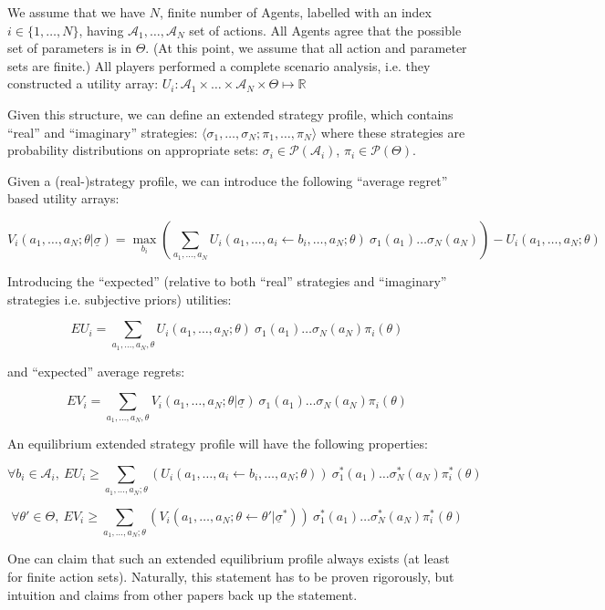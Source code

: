 \documentclass{article}
\begin{document}
We assume that we have $N$, finite number of Agents, labelled with an index $i \in \{1,\dots,N\}$, having $\mathcal{A}_1,\dots,\mathcal{A}_N$ set of actions.
All Agents agree that the possible set of parameters is in $\Theta$.
(At this point, we assume that all action and parameter sets are finite.)
All players performed a complete scenario analysis, i.e. they constructed a utility array:
$U_i : \mathcal{A}_1 \times \dots \times \mathcal{A}_N \times \Theta \mapsto \mathbb{R}$

Given this structure, we can define an extended strategy profile, which contains ``real'' and ``imaginary'' strategies: $\langle \sigma_1,\dots,\sigma_N; \pi_1,\dots,\pi_N \rangle$ where these strategies are probability distributions on appropriate sets:
$\sigma_i \in \mathscr{P}(\mathcal{A}_i)$, $\pi_i \in \mathscr{P}(\Theta)$.

Given a (real-)strategy profile, we can introduce the following ``average regret'' based utility arrays:

\[
V_i (a_1,\dots,a_N;\theta | \underline{\sigma}) = \max_{b_i} 
\left (
\sum_{a_1,\dots,a_N} U_i(a_1,\dots,a_i \leftarrow b_i,\dots,a_N;\theta) \ 
\sigma_1(a_1) \dots \sigma_N(a_N)
\right )
- U_i(a_1,\dots,a_N;\theta)
\]

Introducing the ``expected'' (relative to both ``real'' strategies and ``imaginary'' strategies i.e. subjective priors) utilities:

\[
EU_i = 
\sum_{a_1,\dots,a_N,\theta} 
U_i(a_1,\dots,a_N;\theta) \ \sigma_1(a_1) \dots \sigma_N(a_N) \pi_i(\theta)
\]

and ``expected'' average regrets:

\[
EV_i =
\sum_{a_1,\dots,a_N,\theta} 
V_i(a_1,\dots,a_N;\theta | \underline{\sigma}) \ \sigma_1(a_1)\dots\sigma_N(a_N) \pi_i(\theta)
\]

An equilibrium extended strategy profile will have the following properties:

\[
\forall b_i \in \mathcal{A}_i, \ 
EU_i \ge
\sum_{a_1,\dots,a_N;\theta} 
\left (
U_i(a_1,\dots,a_i \leftarrow b_i,\dots,a_N;\theta)
\right ) \ 
\sigma^*_1(a_1) \dots \sigma^*_N(a_N) \pi^*_i(\theta)
\]

\[
\forall \theta' \in \Theta, \ 
EV_i \ge
\sum_{a_1,\dots,a_N;\theta} 
\left (
V_i(a_1,\dots,a_N;\theta \leftarrow \theta' | \underline{\sigma}^*)
\right ) \ 
\sigma^*_1(a_1) \dots \sigma^*_N(a_N) \pi^*_i(\theta)
\]

One can claim that such an extended equilibrium profile always exists (at least for finite action sets). Naturally, this statement has to be proven rigorously, but intuition and claims from other papers back up the statement.
\end{document}
